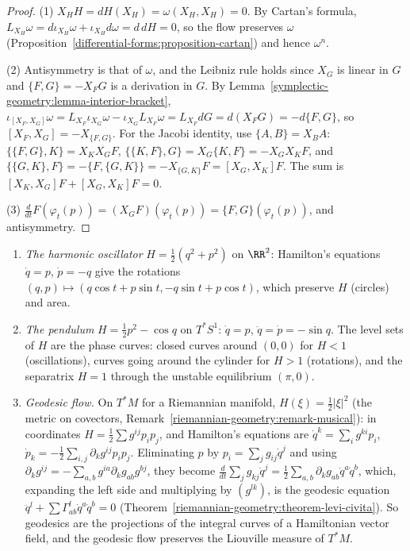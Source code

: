 \begin{proof}
(1) $X_HH = dH(X_H) = \omega(X_H, X_H) = 0$. By Cartan's formula, $L_{X_H}\omega = d\iota_{X_H}\omega + \iota_{X_H}d\omega = d\,dH = 0$, so the flow preserves $\omega$
(Proposition~\ref{differential-forms:proposition-cartan}) and hence $\omega^n$.

(2) Antisymmetry is that of $\omega$, and the Leibniz rule holds since $X_G$ is linear in $G$ and $\{F, G\} = -X_FG$ is a derivation in $G$. By Lemma~\ref{symplectic-geometry:lemma-interior-bracket},
$\iota_{[X_F, X_G]}\omega = L_{X_F}\iota_{X_G}\omega - \iota_{X_G}L_{X_F}\omega = L_{X_F}dG = d(X_FG) = -d\{F, G\}$, so $[X_F, X_G] = -X_{\{F, G\}}$. For the Jacobi identity, use $\{A, B\} = X_BA$:
$\{\{F, G\}, K\} = X_KX_GF$, $\{\{K, F\}, G\} = X_G\{K, F\} = -X_GX_KF$, and $\{\{G, K\}, F\} = -\{F, \{G, K\}\} = -X_{\{G, K\}}F = [X_G, X_K]F$. The sum is $[X_K, X_G]F + [X_G, X_K]F = 0$.

(3) $\frac{d}{dt}F(\varphi_t(p)) = (X_GF)(\varphi_t(p)) = \{F, G\}(\varphi_t(p))$, and antisymmetry.
\end{proof}

\begin{example}\label{symplectic-geometry:example-hamiltonian}
\begin{enumerate}
\item \emph{The harmonic oscillator} $H = \frac12(q^2 + p^2)$ on $\RR^2$: Hamilton's equations $\dot q = p$, $\dot p = -q$ give the rotations $(q, p) \mapsto (q\cos t + p\sin t, -q\sin t + p\cos t)$, which preserve
$H$ (circles) and area.
\item \emph{The pendulum} $H = \frac12p^2 - \cos q$ on $T^*S^1$: $\dot q = p$, $\ddot q = \dot p = -\sin q$. The level sets of $H$ are the phase curves: closed curves around $(0, 0)$ for $H < 1$ (oscillations), curves
going around the cylinder for $H > 1$ (rotations), and the separatrix $H = 1$ through the unstable equilibrium $(\pi, 0)$.
\item \emph{Geodesic flow.} On $T^*M$ for a Riemannian manifold, $H(\xi) = \frac12|\xi|^2$ (the metric on covectors, Remark~\ref{riemannian-geometry:remark-musical}): in coordinates $H = \frac12\sum g^{ij}p_ip_j$, and
Hamilton's equations are $\dot q^k = \sum_ig^{ki}p_i$, $\dot p_k = -\frac12\sum_{i,j}\partial_kg^{ij}p_ip_j$. Eliminating $p$ by $p_i = \sum_jg_{ij}\dot q^j$ and using
$\partial_kg^{ij} = -\sum_{a,b}g^{ia}\partial_kg_{ab}g^{bj}$, they become $\frac{d}{dt}\sum_jg_{kj}\dot q^j = \frac12\sum_{a,b}\partial_kg_{ab}\dot q^a\dot q^b$, which, expanding the left side and multiplying by
$(g^{lk})$, is the geodesic equation $\ddot q^l + \sum\Gamma^l_{ab}\dot q^a\dot q^b = 0$ (Theorem~\ref{riemannian-geometry:theorem-levi-civita}). So
geodesics are the projections of the integral curves of a Hamiltonian vector field, and the geodesic flow preserves the Liouville measure of $T^*M$.
\end{enumerate}
\end{example}

